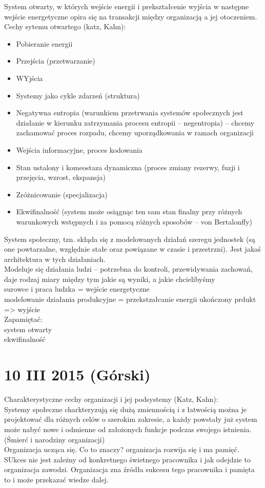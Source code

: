 \documentclass[a4paper,10pt]{report}
\begin{document}
System otwarty, w których wejście energii i prekształcenie wyjścia w następne wejście energetyczne opira się na transakcji między organizacją a jej otoczeniem. \\
Cechy sytemu otwartego (katz, Kahn):
\begin{itemize}
	\item Pobieranie energii
	\item Przejścia (przetwarzanie)
	\item WYjścia
	\item Systemy jako cykle zdarzeń (struktura)
	\item Negatywna entropia (warunkiem przetrwania systemów społecznych jest działanie w kierunku zatrzymania procesu entropii -- negentropia) -- chcemy zachamować proces rozpadu, chcemy uporządkowania w ramach organizacji
	\item Wejścia informacyjne, proces kodowania
	\item Stan ustalony i komeostaza dynamiczna (proces zmiany rezerwy, fuzji i przejęcia, wzrost, ekspansja)
	\item Zróżnicowanie (specjalizacja)
	\item Ekwifinalność (system może osiągnąc ten sam stan finalny przy różnych warunkowych wstępnych i za pomocą różnych sposobów -- von Bertalonffy)
\end{itemize}

System społeczny, tzn. skłąda się z modelowanych działań szeregu jednostek (są one powtarzalne, względnie stałe oraz powiązane w czasie i przestrzni). 
Jest jakaś architektura w tych działaniach.\\ 
Modeluje się działania ludzi -- potrzebna do kontroli, przewidywania zachowań, daje rodzaj miary między tym jakie są wyniki, a jakie chcielibyśmy \\
surowce i praca ludzka = wejście energetyczne \\
modelowanie działania produkcyjne = przekstzałcanie energii
ukończony prdukt => wyjście\\

Zapamiętać:\\
system otwarty\\
ekwifinalność\\

\section{10 III 2015 (Górski)}
Charakterystyczne cechy organizacji i jej podsystemy (Katz, Kahn):\\
Systemy społeczne charkteryzują się dużą zmiennością i z łatwością można je projektować dla różnych celów o szerokim zakresie, a każdy powstały już system może nabyć nowe i odmienne od założonych funkcje podczas swojego istnienia. (Śmierć i narodziny organizacji)\\
Organizacja ucząca się. Co to znaczy? organizacja rozwija się i ma pamięć. SUkces nie jest zależny od konkretnego świetnego pracownika i jak odejdzie to organizacja zawodzi. Organizacja zna źródła sukcesu tego pracownika i pamięta to i może przekazać wiedze dalej.\\
\end{document}
